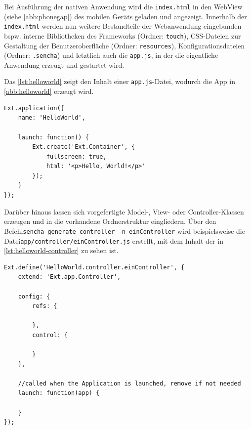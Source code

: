 \protect{}

Bei Ausführung der nativen Anwendung wird die \texttt{index.html} in den WebView (siehe \vref{abb:phonegap}) des mobilen Geräts geladen und angezeigt. Innerhalb der \texttt{index.html} werden nun weitere Bestandteile der Webanwendung eingebunden -- bspw. interne Bibliotheken des Frameworks (Ordner: \texttt{touch}), CSS-Dateien zur Gestaltung der Benutzeroberfläche (Ordner: \texttt{resources}), Konfigurationsdateien (Ordner: \texttt{.sencha}) und letztlich auch die \texttt{app.js}, in der die eigentliche Anwendung erzeugt und gestartet wird.

Das \vref{lst:helloworld} zeigt den Inhalt einer \texttt{app.js}-Datei, wodurch die App in \vref{abb:helloworld} erzeugt wird.

\begin{programm}[H]
	\begin{lstlisting}
Ext.application({
    name: 'HelloWorld',

    launch: function() {
        Ext.create('Ext.Container', {
            fullscreen: true,
            html: '<p>Hello, World!</p>'
        });
    }
});
	\end{lstlisting}
\end{programm}

Darüber hinaus lassen sich vorgefertigte Model-, View- oder Controller-Klassen erzeugen und in die vorhandene Ordnerstruktur eingliedern. Über den Befehl\linebreak \lstinline|sencha generate controller -n einController| wird beispielsweise die Datei\linebreak \texttt{app/controller/einController.js} erstellt, mit dem Inhalt der in \vref{lst:helloworld-controller} zu sehen ist.

\begin{programm}[H]
	\begin{lstlisting}
Ext.define('HelloWorld.controller.einController', {
    extend: 'Ext.app.Controller',
    
    config: {
        refs: {
            
        },
        control: {
            
        }
    },
    
    //called when the Application is launched, remove if not needed
    launch: function(app) {
        
    }
});
	\end{lstlisting}
\end{programm}

